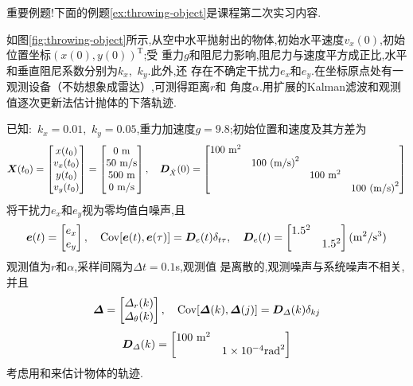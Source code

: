 \documentclass[cn,10pt,citestyle=gb7714-2015,bibstyle=gb7714-2015]{elegantbook}
\newcommand{\mT}{\mathrm{T}}
\newcommand{\Cov}{\textup{Cov}}
\begin{document}
\begin{note}
  重要例题!下面的例题\ref{ex:throwing-object}是课程第二次实习内容.
\end{note}
\begin{example}\label{ex:throwing-object}
  如图\ref{fig:throwing-object}所示,从空中水平抛射出的物体,初始水平速度$v_x(0)$,初始位置坐标$(x(0),y(0))^\mT$;受
  重力$g$和阻尼力影响,阻尼力与速度平方成正比,水平和垂直阻尼系数分别为$k_x$,\ $k_y$.此外,还
  存在不确定干扰力$e_x$和$e_y$.在坐标原点处有一观测设备（不妨想象成雷达）,可测得距离$r$和
  角度$\alpha$.用扩展的Kalman滤波和观测值逐次更新法估计抛体的下落轨迹.

  已知:\ $k_x=0.01$,\ $k_y=0.05$,重力加速度$g=9.8$;初始位置和速度及其方差为
  \[
    \bm{X}(t_0)=\begin{bmatrix}
      x(t_0)\\
      v_x(t_0)\\
      y(t_0)\\
      v_y(t_0)
    \end{bmatrix}=
    \begin{bmatrix}
      0\ \textup{m}\\
      50\ \textup{m/s}\\
      500\ \textup{m}\\
      0\ \textup{m/s}
    \end{bmatrix},\quad\bm{D}_{\hat{X}}(0)=\begin{bmatrix}
      100\ \textup{m}^2& & & \\
       &100\ \textup{(m/s)}^2& & \\
       & &100\ \textup{m}^2& \\
       & & &100\ \textup{(m/s)}^2
    \end{bmatrix}
  \]
  将干扰力$e_x$和$e_y$视为零均值白噪声,且
  \[
    \bm{e}(t)=\begin{bmatrix}
      e_x\\
      e_y
    \end{bmatrix},\quad\Cov[\bm{e}(t),\bm{e}(\tau)]=\bm{D}_e(t)\delta_{t\tau},\quad\bm{D}_e(t)=\begin{bmatrix}
      1.5^2& \\
       &1.5^2
    \end{bmatrix}(\textup{m}^2/\textup{s}^3)
  \]
  观测值为$r$和$\alpha$,采样间隔为$\Delta t=0.1$s,观测值
  是离散的,观测噪声与系统噪声不相关,并且
  \[
    \bm{\varDelta}=\begin{bmatrix}
      \varDelta_r(k)\\
      \varDelta_\theta(k)
    \end{bmatrix},\quad\Cov[\bm{\varDelta}(k),\bm{\varDelta}(j)]=\bm{D}_\varDelta(k)\delta_{kj}
  \]
  \[
    \bm{D}_\varDelta(k)=\begin{bmatrix}
      100\ \textup{m}^2& \\
       &1\times 10^{-4}\textup{rad}^2
    \end{bmatrix}
  \]
  考虑用和来估计物体的轨迹.
\end{example}
\end{document}
